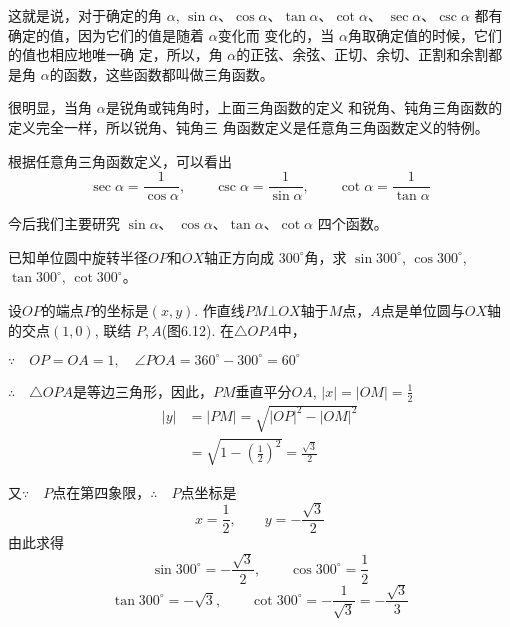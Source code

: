 这就是说，对于确定的角 $\alpha$, $\sin\alpha$、$\cos \alpha$、$\tan \alpha$、$\cot \alpha$、
$\sec\alpha$、$\csc\alpha$
都有确定的值，因为它们的值是随着 $\alpha$变化而
变化的，当 $\alpha$角取确定值的时候，它们的值也相应地唯一确
定，所以，角 $\alpha$的正弦、余弦、正切、余切、正割和余割都
是角 $\alpha$的函数，这些函数都叫做三角函数。

很明显，当角 $\alpha$是锐角或钝角时，上面三角函数的定义
和锐角、钝角三角函数的定义完全一样，所以锐角、钝角三
角函数定义是任意角三角函数定义的特例。

根据任意角三角函数定义，可以看出
\[\sec\alpha=\frac{1}{\cos\alpha},\qquad \csc \alpha=\frac{1}{\sin\alpha},\qquad \cot \alpha=\frac{1}{\tan\alpha}\]

今后我们主要研究
$\sin \alpha$、 $\cos \alpha$、$\tan \alpha$、$\cot \alpha$ 四个函数。

\begin{example}
    已知单位圆中旋转半径$OP$和$OX$轴正方向成
$300^{\circ}$角，求 $\sin300^{\circ}$, $\cos300^{\circ}$, $\tan 300^{\circ}$, $\cot300^{\circ}$。

\end{example}

\begin{solution}
    设$OP$的端点$P$的坐标是$(x,y)$. 作直线$PM\bot OX$轴于$M$点，$A$点是单位圆与$OX$轴的交点$(1,0)$, 联结
$P,A$(图6.12). 在$\triangle OPA$中，

$\because\quad OP=OA=1,\quad \angle POA=360^{\circ}-300^{\circ}=60^{\circ}$

$\therefore\quad \triangle OPA$是等边三角形，因此，$PM$垂直平分$OA$,
$|x|=|OM|=\frac{1}{2}$
\[\begin{split}
    |y|&=|PM|=\sqrt{|OP|^2-|OM|^2}\\
&=\sqrt{1-\left(\frac{1}{2}\right)^2}=\frac{\sqrt{3}}{2}
\end{split}\]

\begin{figure}[htp]
    \centering
{}
    \caption{}
\end{figure}

又$\because\quad P$点在第四象限，$\therefore\quad P$点坐标是
\[x=\frac{1}{2},\qquad y=-\frac{\sqrt{3}}{2}\]
由此求得
\[\sin300^{\circ}=-\frac{\sqrt{3}}{2},\qquad 
\cos300^{\circ}=\frac{1}{2}\]
\[
\tan300^{\circ}=-\sqrt{3},\qquad 
\cot300^{\circ}=-\frac{1}{\sqrt{3}}=-\frac{\sqrt{3}}{3}\]
\end{solution}


